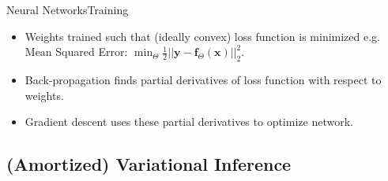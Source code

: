 \documentclass{beamer}
\begin{document}
\begin{frame}{Neural Networks}{Training}
\begin{itemize}
\item Weights trained such that (ideally convex) loss function is minimized e.g. Mean Squared Error: $\min_\Theta \frac{1}{2}||\bm{y}-\bm{f}_\Theta(\bm{x})||^2_2$.
\item Back-propagation finds partial derivatives of loss function with respect to weights.
\item Gradient descent uses these partial derivatives to optimize network.
\end{itemize}
\end{frame}
\subsection{(Amortized) Variational Inference}
\end{document}
